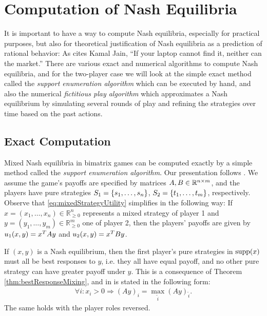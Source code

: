 \documentclass[a4paper,DIV=11]{scrreprt}
\newcommand{\Rp}{\mathbb{R}_{\geq 0}}
\theoremstyle{definition}
\begin{document}
    
    \section{Computation of Nash Equilibria}
    It is important to have a way to compute Nash equilibria, especially for practical purposes, but also for theoretical justification of Nash equilibria as a prediction of rational behavior: As \cite[p.30]{bib:nisanAlgorithmicGameTheoryCh2ComplexityNash} cites Kamal Jain, “If your laptop cannot
find it, neither can the market.” There are various exact and numerical algorithms to compute Nash equilibria, and for the two-player case we will look at the simple exact method called the \emph{support enumeration algorithm} which can be executed by hand, and also the numerical \emph{fictitious play algorithm} which approximates a Nash equilibrium by simulating several rounds of play and refining the strategies over time based on the past actions.
    
    \subsection{Exact Computation}
    \label{subsec:exactComputationNashEquilibriaSupportEnumerationAlgorithm}
    Mixed Nash equilibria in bimatrix games can be computed exactly by a simple method called the \emph{support enumeration algorithm}.
    Our presentation follows \cite{bib:nisanAlgorithmicGameTheoryCh3EquilibriumComputation}.
    We assume the game's payoffs are specified by matrices $A, B \in \mathbb{R}^{n\times m}$, and the players have pure strategies $S_1 = \{s_1,\dots,s_n\}$, $S_2 = \{t_1,\dots,t_m\}$, respectively.
    Observe that \eqref{eq:mixedStrategyUtility} simplifies in the following way: If $x = (x_1,\dots,x_n) \in \Rp^n$ represents a mixed strategy of player 1 and $y = (y_1,\dots,y_m) \in \Rp^m$ one of player 2, then the players' payoffs are given by $u_1(x,y) = x^{T} A y$ and $u_2(x,y) = x^{T} B y$.
    
    If $(x, y)$ is a Nash equilibrium, then the first player's pure strategies in $\operatorname{supp}(x)$ must all be best responses to $y$, i.e. they all have equal payoff, and no other pure strategy can have greater payoff under $y$. This is a consequence of Theorem \ref{thm:bestResponseMixing}, and in \cite[p.55]{bib:nisanAlgorithmicGameTheoryCh3EquilibriumComputation} is stated in the following form:
    \begin{gather}
        \forall i: x_i > 0 \Rightarrow (Ay)_i = \max_{\tilde{i}} (Ay)_{\tilde{i}}.
        \label{eq:equalMaxPureStrategyPayoffsLinearSystem}
    \end{gather}
    The same holds with the player roles reversed.
    
\end{document}
